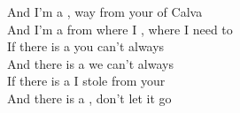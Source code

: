 And I'm a ,  way from your  of Calva \\
And I'm a   from where I , where I need to  \\
If there is a  you can't always  \\
And there is a  we can't always  \\
If there is a  I stole from your  \\
And there is a , don't let it go  \\

